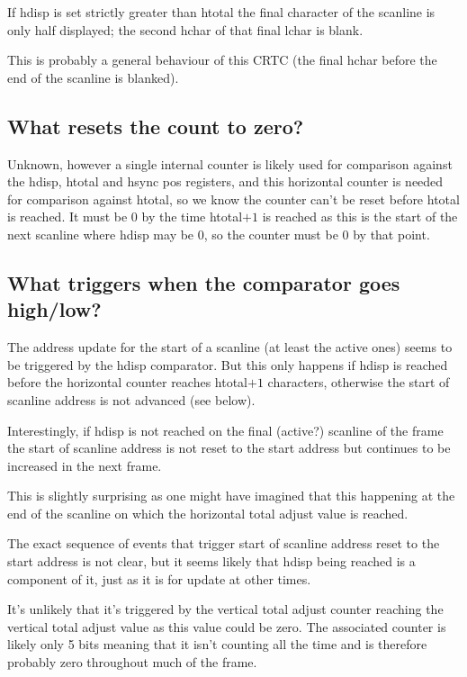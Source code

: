 \documentclass[a4paper,10pt]{amsart}
\begin{document}
If hdisp is set strictly greater than htotal the final character of the
scanline is only half displayed; the second hchar of that final lchar is blank.

This is probably a general behaviour of this CRTC (the final hchar before
the end of the scanline is blanked).

\subsection{What resets the count to zero?}

Unknown, however a single internal counter is likely used for comparison
against the hdisp, htotal and hsync pos registers, and this horizontal counter
is needed for comparison against htotal, so we know the counter can't be reset
before htotal is reached. It must be 0 by the time htotal$+1$ is reached as
this is the start of the next scanline where hdisp may be $0$, so the counter
must be $0$ by that point.

\subsection{What triggers when the comparator goes high/low?}

The address update for the start of a scanline (at least the active ones) seems
to be triggered by the hdisp comparator. But this only happens if hdisp
is reached before the horizontal counter reaches htotal$+1$ characters,
otherwise the start of scanline address is not advanced (see below).

Interestingly, if hdisp is not reached on the final (active?) scanline of the
frame the start of scanline address is not reset to the start address but
continues to be increased in the next frame.

This is slightly surprising as one might have imagined that this happening
at the end of the scanline on which the horizontal total adjust value is
reached.

The exact sequence of events that trigger start of scanline address reset to
the start address is not clear, but it seems likely that hdisp being reached is
a component of it, just as it is for update at other times.

It's unlikely that it's triggered by the vertical total adjust counter reaching
the vertical total adjust value as this value could be zero. The associated
counter is likely only 5 bits meaning that it isn't counting all the time and is
therefore probably zero throughout much of the frame.
\end{document}

